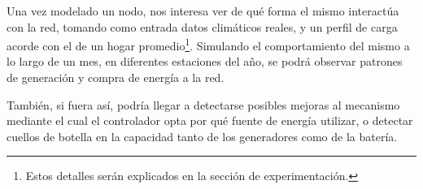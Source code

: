 
Una vez modelado un nodo, nos interesa ver de qué forma el mismo interactúa
con la red, tomando como entrada datos climáticos reales, y un perfil de
carga acorde con el de un hogar promedio\footnote{Estos detalles serán
explicados en la sección de experimentación.}. Simulando el comportamiento
del mismo a lo largo de un mes, en diferentes estaciones del año, se podrá
observar patrones de generación y compra de energía a la red. 

También, si fuera así, podría llegar a detectarse posibles mejoras al
mecanismo mediante el cual el controlador opta por qué fuente de energía
utilizar, o detectar cuellos de botella en la capacidad tanto de los
generadores como de la batería.